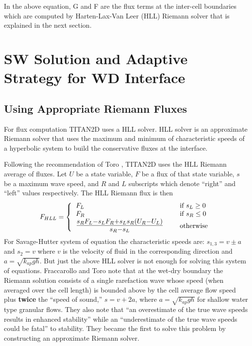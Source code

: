 \documentclass[letterpaper,10pt]{article}
\begin{document}
In the above equation, G and F are the flux terms at the inter-cell boundaries which are computed by Harten-Lax-Van Leer (HLL) \cite{Toro2009riemann} Riemann solver that is explained 
in the next section.

\section{SW Solution and Adaptive Strategy for WD Interface }

\subsection{Using Appropriate Riemann Fluxes} \label{Riemann}
For flux computation TITAN2D uses a HLL solver. HLL solver is an approximate Riemann solver that  uses the maximum and 
minimum of characteristic speeds of a hyperbolic system to build the conservative fluxes at the interface.

Following the recommendation of Toro \cite{ToroBook2001}, TITAN2D uses 
the HLL Riemann average of fluxes. Let $U$ be a state variable, $F$ 
be a flux of that state variable, $s$ be a maximum wave speed, 
and $R$ and $L$ subscripts which denote ``right'' and ``left'' values 
respectively.  The HLL Riemann flux is then
\begin{equation}
	F_{HLL}=\left\{
		\begin{tabular}{lll}
			$F_L$&\hspace{0.5 truein}& if $s_L\ge 0$\\
			$F_R$&& if $s_R\le 0$\\
			{\Large $\frac{s_RF_L-s_LF_R+s_Ls_R(U_R-U_L)}{s_R-s_L}$}&& otherwise
		\end{tabular} 
	\right.
\end{equation}
For Savage-Hutter system of equation the characteristic speeds are: $s_{1,3}=v\pm a$ and $s_2=v$ where $v$ is the 
velocity of fluid in the corresponding direction and $a=\sqrt{k_{ap}gh}$.
But just the above HLL solver is not enough for solving this system of equations.
Fraccarollo and Toro \cite{FraccarolloToro1995} note that at the 
wet-dry boundary the Riemann solution consists of a single rarefaction 
wave whose speed (when averaged over the cell length) 
is bounded above by the cell average flow speed plus 
{\bf twice} the ``speed of sound,'' $s=v+2a$, where $a=\sqrt{k_{ap}gh}$ 
for shallow water type granular flows.  They also note that ``an overestimate 
of the true wave speeds results in enhanced stability'' while an 
``underestimate of the true wave speeds could be fatal'' to stability.
They became the first to 
solve this problem by constructing an approximate Riemann solver.\newline
\end{document}
